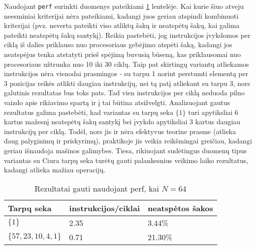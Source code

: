 \documentclass{VUMIFInfBakalaurinis}
\begin{document}
Naudojant \verb|perf| surinkti duomenys pateikiami \ref{perf_results_64} lentelėje.
Kai kurie šiuo atveju neesminiai kriterijai nėra pateikiami, kadangi juos geriau atspindi kombinuoti kriterijai
(pvz. neverta pateikti viso atliktų šakų ir neatspėtų šakų, kai galima pateikti neatspėtų šakų santykį).
Reikia pastebėti, jog instrukcijos įvykdomos per ciklą iš dalies priklauso nuo procesoriaus gebėjimo atspėti šaką, kadangi jos neatspėjus tenka atstatyti prieš spėjimą buvusią būseną,
kas priklausomai nuo procesoriaus užtrunka nuo 10 iki 30 ciklų.
Taip pat skirtingų variantų atliekamos instrukcijos nėra vienodai prasmingos - su tarpu 1 norint perstumti elementą per 3 pozicijas reikės atlikti daugiau instrukcijų,
nei tą patį atliekant su tarpu 3, nors galutinis rezultatas bus toks pats.
Tad vien instrukcijos per ciklą neduoda pilno vaizdo apie rikiavimo spartą ir į tai būtina atsižvelgti.
Analizuojant gautus rezultatus galima pastebėti, kad variantas su tarpų seka $\{1\}$ turi apytiksliai 6 kartus mažesnį neatspėtų šakų santykį bei įvykdo apytiksliai 3 kartus daugiau instrukcijų per ciklą.
Todėl, nors jis ir nėra efektyvus teorine prasme (atlieka daug palyginimų ir priskyrimų), praktikoje jis veikia reikšmingai greičiau, kadangi geriau išnaudoja mašinos galimybes.
Tiesa, rikiuojant sudėtingus duomenų tipus variantas su Ciura tarpų seka turėtų gauti palankesnius veikimo laiko rezultatus, kadangi atlieka mažiau operacijų.

\begin{table}[H]
  \caption{Rezultatai gauti naudojant perf, kai $N = 64$}
  \label{perf_results_64}
  \centering
  \begin{tabular}{@{}lll@{}}
  Tarpų seka            & instrukcijos/ciklai     & neatspėtos šakos \\ \midrule
  $\{1\}$               & 2.35                    & 3.44\%           \\
  $\{57,23,10,4,1\}$    & 0.71                    & 21.30\%          \\ \bottomrule
  \end{tabular}
\end{table}
\end{document}
